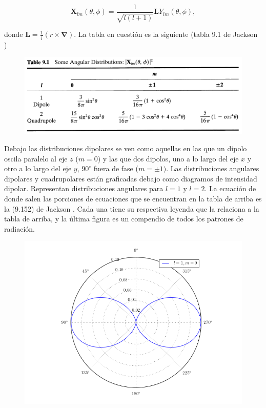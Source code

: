 \documentclass[a4paper,11pt]{article}
\numberwithin{equation}{section}
\begin{document}
\begin{equation}
 \mathbf{X}_{lm}(\theta,\phi) = \frac{1}{\sqrt{l(l+1)}}\mathbf{L}Y_{lm}(\theta,\phi),
\end{equation}

donde $\mathbf{L} = \frac{1}{i}(r \times \pmb{\nabla})$. La tabla en cuestión 
es la siguiente (tabla 9.1 de Jackson \cite{jackson})

\begin{figure}[H]
 \center 
 \includegraphics[scale=0.5]{problema3fig1}
\end{figure}

Debajo las distribuciones dipolares se ven como aquellas en las que un dipolo 
oscila paralelo al eje $z$ ($m=0$) y las que dos dipolos, uno a lo largo del eje 
$x$ y otro a lo largo del eje $y$, $90^\circ$ fuera de fase ($m = \pm 1)$. Las 
distribuciones angulares dipolares y cuadrupolares están graficadas 
debajo como diagramos de intensidad dipolar. Representan distribuciones angulares 
para $l=1$ y $l=2$. La ecuación de donde salen las porciones de ecuaciones que 
se encuentran en la tabla de arriba es la (9.152) de Jackson \cite{jackson}. Cada 
una tiene su respectiva leyenda que la relaciona a la tabla de arriba, y la última 
figura es un compendio de todos los patrones de radiación.

\begin{figure}[H]
 \center
 \includegraphics[scale=0.6]{problema3fig2}
\end{figure}
\end{document}
